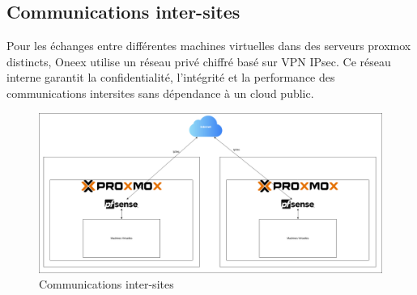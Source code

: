 \subsection{Communications inter-sites}

Pour les échanges entre différentes machines virtuelles dans des serveurs proxmox distincts, Oneex utilise un réseau privé chiffré basé sur VPN IPsec. Ce réseau interne garantit la confidentialité, l’intégrité et la performance des communications intersites sans dépendance à un cloud public.

\begin{figure} [H]
	\centering
	\includegraphics[width= \textwidth]{figures/Reseau intra proxmox.png}
	\caption{Communications inter-sites}
\end{figure}